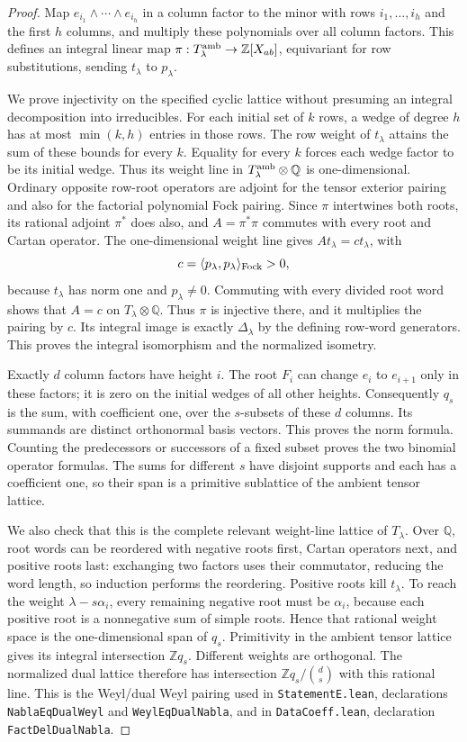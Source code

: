 \begin{proof}
Map $e_{i_1}\wedge\cdots\wedge e_{i_h}$ in a column factor to the minor
with rows $i_1,\ldots,i_h$ and the first $h$ columns, and multiply these
polynomials over all column factors. This defines an integral linear map
$\pi:T^{\rm amb}_\lambda\to\mathbb Z[X_{ab}]$, equivariant for row
substitutions, sending $t_\lambda$ to $p_\lambda$.

We prove injectivity on the specified cyclic lattice without presuming
an integral decomposition into irreducibles. For each initial set of
$k$ rows, a wedge of degree $h$ has at most $\min(k,h)$ entries in those
rows. The row weight of $t_\lambda$ attains the sum of these bounds for
every $k$. Equality for every $k$ forces each wedge factor to be its
initial wedge. Thus its weight line in $T^{\rm amb}_\lambda\otimes\mathbb Q$
is one-dimensional. Ordinary opposite row-root operators are adjoint
for the tensor exterior pairing and also for the factorial polynomial
Fock pairing. Since $\pi$ intertwines both roots, its rational adjoint
$\pi^*$ does also, and $A=\pi^*\pi$ commutes with every root and Cartan
operator. The one-dimensional weight line gives
$At_\lambda=c t_\lambda$, with
\[
 c=\langle p_\lambda,p_\lambda\rangle_{\rm Fock}>0,
\]
because $t_\lambda$ has norm one and $p_\lambda\ne0$.
Commuting with every divided root word shows that $A=c$ on
$T_\lambda\otimes\mathbb Q$. Thus $\pi$ is injective there, and it
multiplies the pairing by $c$. Its integral image is exactly
$\Delta_\lambda$ by the defining row-word generators. This proves the
integral isomorphism and the normalized isometry.

Exactly $d$ column factors have height $i$. The root $F_i$ can change
$e_i$ to $e_{i+1}$ only in these factors; it is zero on the initial
wedges of all other heights. Consequently $q_s$ is the sum, with
coefficient one, over the $s$-subsets of these $d$ columns. Its summands
are distinct orthonormal basis vectors. This proves the norm formula.
Counting the predecessors or successors of a fixed subset proves the
two binomial operator formulas. The sums for different $s$ have
disjoint supports and each has a coefficient one, so their span is a
primitive sublattice of the ambient tensor lattice.

We also check that this is the complete relevant weight-line lattice of
$T_\lambda$. Over $\mathbb Q$, root words can be reordered with negative
roots first, Cartan operators next, and positive roots last: exchanging
two factors uses their commutator, reducing the word length, so induction
performs the reordering. Positive roots kill $t_\lambda$. To reach the
weight $\lambda-s\alpha_i$, every remaining negative root must be
$\alpha_i$, because each positive root is a nonnegative sum of simple
roots. Hence that rational weight space is the one-dimensional span
of $q_s$. Primitivity in the ambient tensor lattice gives its integral
intersection $\mathbb Z q_s$. Different weights are orthogonal. The
normalized dual lattice therefore has intersection
$\mathbb Z q_s/\binom ds$ with this rational line. This is the Weyl/dual
Weyl pairing used in \texttt{StatementE.lean}, declarations
\texttt{NablaEqDualWeyl} and \texttt{WeylEqDualNabla}, and in
\texttt{DataCoeff.lean}, declaration \texttt{FactDelDualNabla}.


\end{proof}
